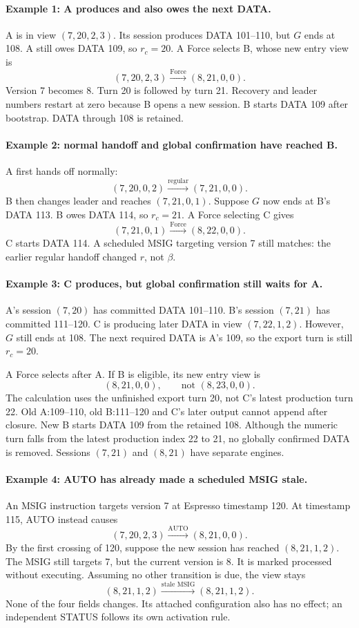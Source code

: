 \documentclass[11pt,a4paper]{article}
\begin{document}
\paragraph{Example 1: A produces and also owes the next DATA.}
A is in view $(7,20,2,3)$. Its session produces DATA 101--110,
but $G$ ends at 108. A still owes DATA 109, so $r_c=20$.
A Force selects B, whose new entry view is
\[
 (7,20,2,3)\xrightarrow{\text{Force}}(8,21,0,0).
\]
Version 7 becomes 8. Turn 20 is followed by turn 21. Recovery and
leader numbers restart at zero because B opens a new session.
B starts DATA 109 after bootstrap. DATA through 108 is retained.

\paragraph{Example 2: normal handoff and global confirmation have reached B.}
A first hands off normally:
\[
 (7,20,0,2)\xrightarrow{\text{regular}}(7,21,0,0).
\]
B then changes leader and reaches $(7,21,0,1)$. Suppose $G$ now ends
at B's DATA 113. B owes DATA 114, so $r_c=21$. A Force selecting C gives
\[
 (7,21,0,1)\xrightarrow{\text{Force}}(8,22,0,0).
\]
C starts DATA 114. A scheduled MSIG targeting version 7 still matches:
the earlier regular handoff changed $r$, not $\beta$.

\paragraph{Example 3: C produces, but global confirmation still waits for A.}
A's session $(7,20)$ has committed DATA 101--110. B's session
$(7,21)$ has committed 111--120. C is producing later DATA in view
$(7,22,1,2)$. However, $G$ still ends at 108. The next required DATA
is A's 109, so the export turn is still $r_c=20$.

A Force selects after A. If B is eligible, its new entry view is
\[
 (8,21,0,0),\qquad\text{not }(8,23,0,0).
\]
The calculation uses the unfinished export turn 20, not C's latest
production turn 22. Old A:109--110, old B:111--120 and C's later output
cannot append after closure. New B starts DATA 109 from the retained 108.
Although the numeric turn falls from the latest production index 22 to
21, no globally confirmed DATA is removed. Sessions $(7,21)$ and
$(8,21)$ have separate engines.

\paragraph{Example 4: AUTO has already made a scheduled MSIG stale.}
An MSIG instruction targets version 7 at Espresso timestamp 120.
At timestamp 115, AUTO instead causes
\[
 (7,20,2,3)\xrightarrow{\text{AUTO}}(8,21,0,0).
\]
By the first crossing of 120, suppose the new session has reached
$(8,21,1,2)$. The MSIG still targets 7, but the current version is 8.
It is marked processed without executing. Assuming no other transition
is due, the view stays
\[
 (8,21,1,2)\xrightarrow{\text{stale MSIG}}(8,21,1,2).
\]
None of the four fields changes. Its attached configuration also has
no effect; an independent STATUS follows its own activation rule.
\end{document}
